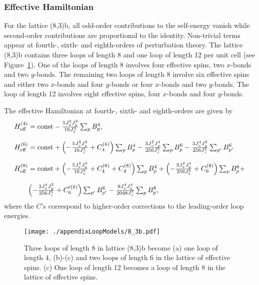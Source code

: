 \subsubsection{Effective Hamiltonian}
%
%
For the lattice (8,3)b, all odd-order contributions to the self-energy vanish while second-order contributions are proportional to the identity.
Non-trivial terms appear at fourth-, sixth- and eighth-orders of perturbation theory.
The lattice (8,3)b contains three loops of length 8 and one loop of length 12 per unit cell (see Figure~\ref{fig:8_3b}).
One of the loops of length 8 involves four effective spins, two $x$-bonds and two $y$-bonds.
The remaining two loops of length 8 involve six effective spins and either two $x$-bonds and four $y$-bonds or four $x$-bonds and two $y$-bonds.
The loop of length 12 involves eight effective spins, four $x$-bonds and four $y$-bonds.

The effective Hamiltonian at fourth-, sixth- and eighth-orders are given by
%
\begin{equation}
\begin{matrix*}[l]
H^{(4)}_{\rm eff} = {\rm const} - \frac{5 J_x^2 J_y^2}{16 J_z^3} \sum_{p} B^4_p, \\
\\
H^{(6)}_{\rm eff} = {\rm const} + \left(-\frac{5 J_x^2 J_y^2}{16 J_z^3} + C_4^{(6)}\right) \sum_{p} B^4_p - \frac{3 J_x^2 J_y^4}{256 J_z^5} \sum_{p} B^6_p - \frac{3 J_x^4 J_y^2}{256 J_z^5} \sum_{p'} B^6_{p'} \\
\\
H^{(8)}_{\rm eff} = {\rm const} + \left(-\frac{5 J_x^2 J_y^2}{16 J_z^3} + C_4^{(6)} + C_4^{(8)}\right) \sum_{p} B^4_p + \left(-\frac{3 J_x^2 J_y^4}{256 J_z^5} + C_{6}^{(8)}\right) \sum_{p} B^6_p + \\
\\
\qquad \left(-\frac{3 J_x^4 J_y^2}{256 J_z^5} + C_{6}'^{(8)}\right) \sum_{p'} B^6_{p'} - \frac{9 J_x^4 J_y^4}{2048 J_z^7} \sum_p B^8_{p},
\end{matrix*}
\label{eq:8_3b_Heff}
\end{equation}
%
where the $C$'s correspond to higher-order corrections to the leading-order loop energies.
%
\begin{figure}[tb]
	\centering
	\texttt{[image: ./appendixLoopModels/8\_3b.pdf]}
	\caption{Three loops of length 8 in lattice (8,3)b become (a) one loop of length 4, (b)-(c) and two loops of length 6 in the lattice of effective spins. (c) One loop of length 12 becomes a loop of length 8 in the lattice of effective spins.}
	\label{fig:8_3b}
\end{figure}
%


